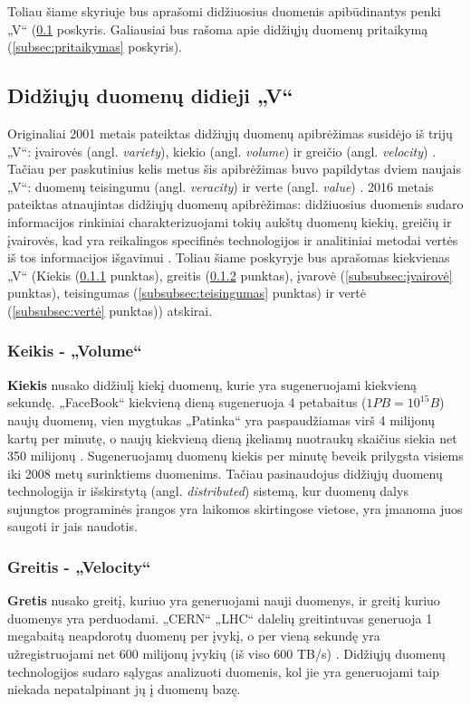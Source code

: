 \documentclass{VUMIFPSkursinis}
\begin{document}
Toliau šiame skyriuje bus aprašomi didžiuosius duomenis apibūdinantys penki „V“ (\ref{subsec:požymiai} poskyris. Galiausiai bus rašoma apie didžiųjų duomenų pritaikymą (\ref{subsec:pritaikymas} poskyris).

\subsection{Didžiųjų duomenų didieji „V“} \label{subsec:požymiai}
Originaliai 2001 metais pateiktas didžiųjų duomenų apibrėžimas susidėjo iš trijų „V“: įvairovės (angl. \textit{variety}), kiekio (angl. \textit{volume}) ir greičio (angl. \textit{velocity}) \cite{three_vs}. Tačiau per paskutinius kelis metus šis apibrėžimas buvo papildytas dviem naujais „V“: duomenų teisingumu (angl. \textit{veracity}) ir verte (angl. \textit{value}) \cite{five_vs_everyone_must_know}. 2016 metais pateiktas atnaujintas didžiųjų duomenų apibrėžimas: didžiuosius duomenis sudaro informacijos rinkiniai charakterizuojami tokių aukštų duomenų kiekių, greičių ir įvairovės, kad yra reikalingos specifinės technologijos ir analitiniai metodai vertės iš tos informacijos išgavimui \cite{bigdata_16}. Toliau šiame poskyryje bus aprašomas kiekvienas „V“ (Kiekis (\ref{subsubsec:kiekis} punktas), greitis (\ref{subsubsec:greitis} punktas), įvarovė (\ref{subsubsec:įvairovė} punktas), teisingumas (\ref{subsubsec:teisingumas} punktas) ir vertė (\ref{subsubsec:vertė} punktas)) atskirai.

\subsubsection{Keikis - „Volume“} \label{subsubsec:kiekis}
\textbf{Kiekis} nusako didžiulį kiekį duomenų, kurie yra sugeneruojami kiekvieną sekundę. „FaceBook“ kiekvieną dieną sugeneruoja 4 petabaitus ($1 PB = {10}^{15} B$) naujų duomenų, vien mygtukas „Patinka“ yra paspaudžiamas virš 4 milijonų kartų per minutę, o naujų kiekvieną dieną įkeliamų nuotraukų skaičius siekia net 350 milijonų \cite{facebook_stats}. Sugeneruojamų duomenų kiekis per minutę beveik prilygsta visiems iki 2008 metų surinktiems duomenims. Tačiau pasinaudojus didžiųjų duomenų technologija ir išskirstytą (angl. \textit{distributed}) sistemą, kur duomenų dalys sujungtos programinės įrangos yra laikomos skirtingose vietose, yra įmanoma juos saugoti ir jais naudotis.

\subsubsection{Greitis - „Velocity“} \label{subsubsec:greitis}
\textbf{Gretis} nusako greitį, kuriuo yra generuojami nauji duomenys, ir greitį kuriuo duomenys yra perduodami. „CERN“ „LHC“ dalelių greitintuvas generuoja 1 megabaitą neapdorotų duomenų per įvykį, o per vieną sekundę yra užregistruojami net 600 milijonų įvykių (iš viso 600 TB/s) \cite{cern}. Didžiųjų duomenų technologijos sudaro sąlygas analizuoti duomenis, kol jie yra generuojami taip niekada nepatalpinant jų į duomenų bazę.
\end{document}
